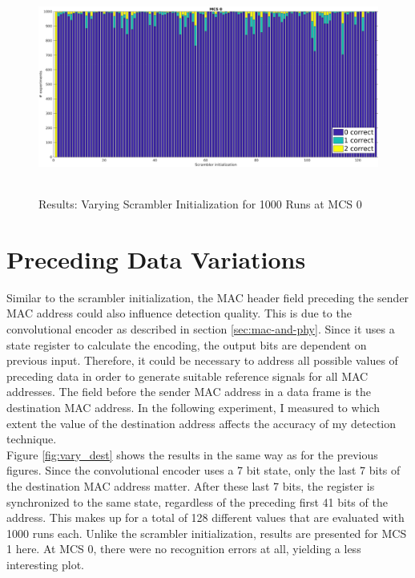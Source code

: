 \begin{figure}[H]
	\centering
	\includegraphics[height=7cm]{gfx/plots/scrambler}
	\caption[Results: Varying Scrambler Initialization for 1000 Runs]{Results: Varying Scrambler Initialization for 1000 Runs at MCS 0}
	\label{fig:vary_scrambler}
\end{figure}



\section{Preceding Data Variations}\label{sec:ex-destination}

Similar to the scrambler initialization, the \gls{MAC} header field preceding the sender \gls{MAC} address could also influence detection quality. This is due to the convolutional encoder as described in section \ref{sec:mac-and-phy}. Since it uses a state register to calculate the encoding, the output bits are dependent on previous input. Therefore, it could be necessary to address all possible values of preceding data in order to generate suitable reference signals for all MAC addresses. The field before the sender \gls{MAC} address in a data frame is the destination \gls{MAC} address. In the following experiment, I measured to which extent the value of the destination address affects the accuracy of my detection technique.\\

Figure \ref{fig:vary_dest} shows the results in the same way as for the previous figures. Since the convolutional encoder uses a 7 bit state, only the last 7 bits of the destination \gls{MAC} address matter. After these last 7 bits, the register is synchronized to the same state, regardless of the preceding first 41 bits of the address. This makes up for a total of 128 different values that are evaluated with 1000 runs each. Unlike the scrambler initialization, results are presented for \gls{MCS} 1 here. At \gls{MCS} 0, there were no recognition errors at all, yielding a less interesting plot.

